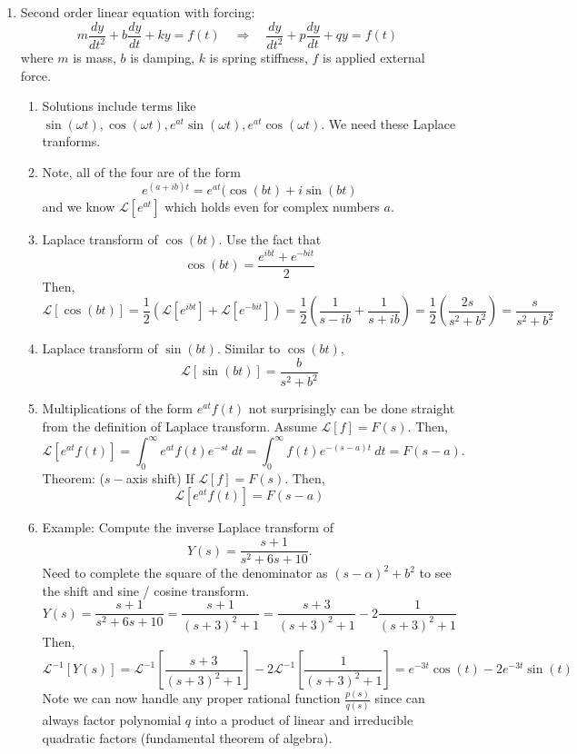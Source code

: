 \documentclass{article}
\begin{document}
\begin{enumerate}
\item Second order linear equation with forcing:
\[
m\frac{dy}{dt^2}+b\frac{dy}{dt} + ky = f(t) \quad \Rightarrow \quad \frac{dy}{dt^2}+p\frac{dy}{dt} + qy = f(t) \
\]
where $m$ is mass, $b$ is damping, $k$ is spring stiffness, $f$ is applied external force.
\begin{enumerate}
\item Solutions include terms like $\sin(\omega t), \cos(\omega t), e^{at}\sin(\omega t), e^{at}\cos(\omega t)$. We need these Laplace tranforms.
\item Note, all of the four are of the form 
\[
e^{(a+ib)t} = e^{at}(\cos(bt)+i\sin(bt)
\]
and we know $\mathcal{L}[e^{at}]$ which holds even for complex numbers $a$.
\item Laplace transform of $\cos(bt)$. Use the fact that 
\[
\cos(bt) = \frac{e^{ibt}+e^{-bit}}{2}
\]
Then,
\[
\mathcal{L}[\cos(bt)] = \frac{1}{2} \left( \mathcal{L}[e^{ibt}]+\mathcal{L}[e^{-bit}]\right) 
= \frac{1}{2} \left( \frac{1}{s-ib} + \frac{1}{s+ib} \right)
= \frac{1}{2} \left( \frac{2s}{s^2+b^2} \right)
= \frac{s}{s^2+b^2}
\]
\item Laplace transform of $\sin(bt)$. Similar to $\cos(bt)$, 
\[
\mathcal{L}[\sin(bt)] = \frac{b}{s^2+b^2}
\]
\item Multiplications of the form $e^{at}f(t)$ not surprisingly can be done straight from the definition of Laplace transform. Assume $\mathcal{L}[f] = F(s)$. Then,
\[
\mathcal{L}[e^{at}f(t)] = \int_0^{\infty} e^{at}f(t) e^{-st}~dt = \int_0^{\infty} f(t) e^{-(s-a)t}~dt = F(s-a).
\]
Theorem: ($s-$axis shift) If $\mathcal{L}[f] = F(s)$. Then,
\[
\mathcal{L}[e^{at}f(t)] = F(s-a)
\]
\item Example: Compute the inverse Laplace transform of 
\[
Y(s) = \frac{s+1}{s^2+6s+10}.
\]
Need to complete the square of the denominator as $(s-\alpha)^2+b^2$ to see the shift and sine / cosine transform.
\[
Y(s) = \frac{s+1}{s^2+6s+10} = \frac{s+1}{(s+3)^2+1}
= \frac{s+3}{(s+3)^2+1} -2 \frac{1}{(s+3)^2+1}
\]
Then, 
\[
\mathcal{L}^{-1}[Y(s)] = 
\mathcal{L}^{-1}\left[
\frac{s+3}{(s+3)^2+1}\right] -2 \mathcal{L}^{-1}\left[\frac{1}{(s+3)^2+1}\right]
= e^{-3t}\cos(t)-2e^{-3t}\sin(t)
\]
Note we can now handle any proper rational function $\frac{p(s)}{q(s)}$ since can always factor polynomial $q$ into a product of linear and irreducible quadratic factors (fundamental theorem of algebra).
\end{enumerate}


\end{enumerate}
\end{document}
